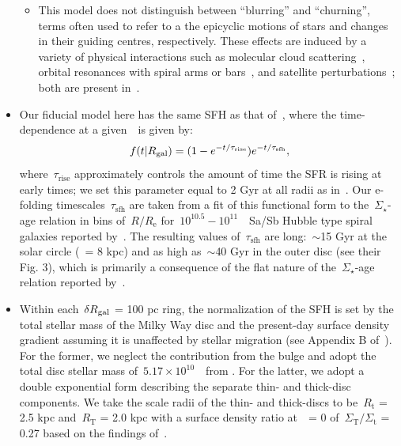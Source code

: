 \documentclass[ms.tex]{subfiles}
\begin{document}
\begin{itemize}
\begin{itemize}
		\item This model does not distinguish between ``blurring'' and 
		``churning'', terms often used to refer to a the epicyclic motions of 
		stars and changes in their guiding centres, respectively. 
		These effects are induced by a variety of physical interactions such as 
		molecular cloud scattering~\citep{Mihalas1981, Jenkins1990, 
		Jenkins1992}, orbital resonances with spiral arms or 
		bars~\citep{Sellwood2002, Minchev2011}, and satellite 
		perturbations~\citep{Bird2012}; both are present in~\hsim. 
	\end{itemize} 

	\item Our fiducial model here has the same SFH as that 
	of~\citet{Johnson2021}, where the time-dependence at a given~\rgal~is given 
	by: 
	\begin{equation} 
	f(t|R_\text{gal}) = (1 - e^{-t/\tau_\text{rise}})e^{-t/\tau_\text{sfh}}, 
	\end{equation} 
	where~$\tau_\text{rise}$ approximately controls the amount of time the SFR 
	is rising at early times; we set this parameter equal to 2 Gyr at all 
	radii as in~\citet{Johnson2021}. 
	Our e-folding timescales~$\tau_\text{sfh}$ are taken from a fit of this 
	functional form to the~$\Sigma_\star$-age relation in bins of~$R/R_\text{e}$ 
	for~$10^{10.5} - 10^{11}$~\msun~Sa/Sb Hubble type spiral galaxies reported 
	by~\citet{Sanchez2020}. 
	The resulting values of~$\tau_\text{sfh}$ are long:~$\sim$15 Gyr at the 
	solar circle (\rgal~= 8 kpc) and as high as~$\sim$40 Gyr in the outer disc 
	(see their Fig. 3), which is primarily a consequence of the flat nature 
	of the~$\Sigma_\star$-age relation reported by~\citet{Sanchez2020}. 

	\item Within each~$\delta R_\text{gal}$ = 100 pc ring, the normalization of the SFH 
	is set by the total stellar mass of the Milky Way disc and the present-day 
	surface density gradient assuming it is unaffected by stellar migration 
	(see Appendix B of~\citealt{Johnson2021}). 
	For the former, we neglect the contribution from the bulge and adopt the 
	total disc stellar mass of~$5.17\times10^{10}$~\msun~from 
	\citet{Licquia2015}. 
	For the latter, we adopt a double exponential form describing the separate 
	thin- and thick-disc components. 
	We take the scale radii of the thin- and thick-discs to be~$R_\text{t}$ = 
	2.5 kpc and~$R_\text{T}$ = 2.0 kpc with a surface density ratio at~\rgal~= 0 
	of~$\Sigma_\text{T}/\Sigma_\text{t}$ = 0.27 based on the findings 
	of~\citet{Bland-Hawthorn2016}. 


\end{itemize}
\end{document}
